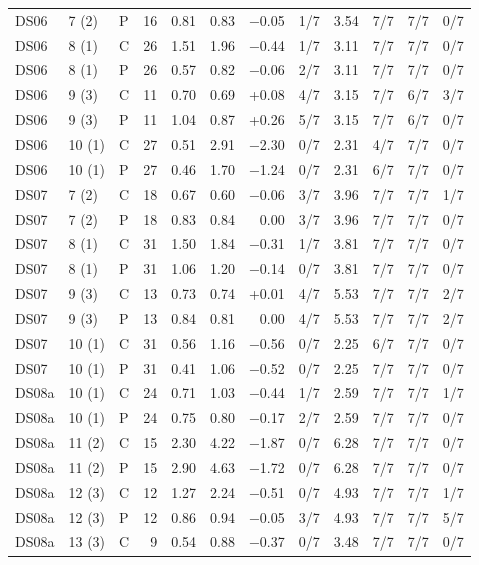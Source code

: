 \documentclass[10pt]{article}
\begin{document}
{\begin{longtable}{lllrrrrrrrrr}
DS06 & 7 (2) & P & 16 & 0.81 & 0.83 & −0.05 & 1/7 & 3.54 & 7/7 & 7/7 & 0/7 \\
DS06 & 8 (1) & C & 26 & 1.51 & 1.96 & −0.44 & 1/7 & 3.11 & 7/7 & 7/7 & 0/7 \\
DS06 & 8 (1) & P & 26 & 0.57 & 0.82 & −0.06 & 2/7 & 3.11 & 7/7 & 7/7 & 0/7 \\
DS06 & 9 (3) & C & 11 & 0.70 & 0.69 & +0.08 & 4/7 & 3.15 & 7/7 & 6/7 & 3/7 \\
DS06 & 9 (3) & P & 11 & 1.04 & 0.87 & +0.26 & 5/7 & 3.15 & 7/7 & 6/7 & 0/7 \\
DS06 & 10 (1) & C & 27 & 0.51 & 2.91 & −2.30 & 0/7 & 2.31 & 4/7 & 7/7 & 0/7 \\
DS06 & 10 (1) & P & 27 & 0.46 & 1.70 & −1.24 & 0/7 & 2.31 & 6/7 & 7/7 & 0/7 \\
\midrule
DS07 & 7 (2) & C & 18 & 0.67 & 0.60 & −0.06 & 3/7 & 3.96 & 7/7 & 7/7 & 1/7 \\
DS07 & 7 (2) & P & 18 & 0.83 & 0.84 & 0.00 & 3/7 & 3.96 & 7/7 & 7/7 & 0/7 \\
DS07 & 8 (1) & C & 31 & 1.50 & 1.84 & −0.31 & 1/7 & 3.81 & 7/7 & 7/7 & 0/7 \\
DS07 & 8 (1) & P & 31 & 1.06 & 1.20 & −0.14 & 0/7 & 3.81 & 7/7 & 7/7 & 0/7 \\
DS07 & 9 (3) & C & 13 & 0.73 & 0.74 & +0.01 & 4/7 & 5.53 & 7/7 & 7/7 & 2/7 \\
DS07 & 9 (3) & P & 13 & 0.84 & 0.81 & 0.00 & 4/7 & 5.53 & 7/7 & 7/7 & 2/7 \\
DS07 & 10 (1) & C & 31 & 0.56 & 1.16 & −0.56 & 0/7 & 2.25 & 6/7 & 7/7 & 0/7 \\
DS07 & 10 (1) & P & 31 & 0.41 & 1.06 & −0.52 & 0/7 & 2.25 & 7/7 & 7/7 & 0/7 \\
\midrule
DS08a & 10 (1) & C & 24 & 0.71 & 1.03 & −0.44 & 1/7 & 2.59 & 7/7 & 7/7 & 1/7 \\
DS08a & 10 (1) & P & 24 & 0.75 & 0.80 & −0.17 & 2/7 & 2.59 & 7/7 & 7/7 & 0/7 \\
DS08a & 11 (2) & C & 15 & 2.30 & 4.22 & −1.87 & 0/7 & 6.28 & 7/7 & 7/7 & 0/7 \\
DS08a & 11 (2) & P & 15 & 2.90 & 4.63 & −1.72 & 0/7 & 6.28 & 7/7 & 7/7 & 0/7 \\
DS08a & 12 (3) & C & 12 & 1.27 & 2.24 & −0.51 & 0/7 & 4.93 & 7/7 & 7/7 & 1/7 \\
DS08a & 12 (3) & P & 12 & 0.86 & 0.94 & −0.05 & 3/7 & 4.93 & 7/7 & 7/7 & 5/7 \\
DS08a & 13 (3) & C & 9 & 0.54 & 0.88 & −0.37 & 0/7 & 3.48 & 7/7 & 7/7 & 0/7 \\

\end{longtable}}
\end{document}
